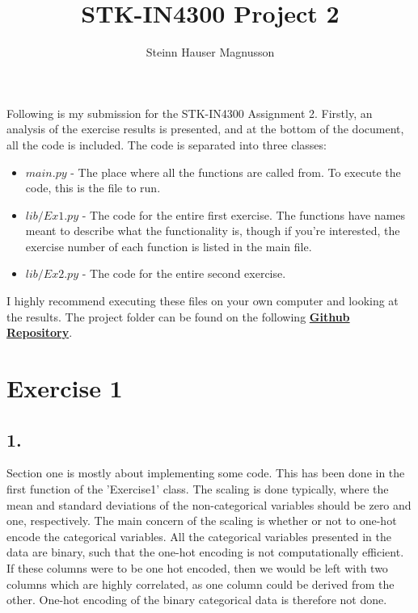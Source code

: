 \documentclass[]{article}
\title{STK-IN4300 Project 2}
\author{Steinn Hauser Magnusson}
\begin{document}
\maketitle

Following is my submission for the STK-IN4300 Assignment 2. Firstly, an analysis of the exercise results is presented, and at the bottom of the document, all the code is included. The code is separated into three classes:
\begin{itemize}
	\item $main.py$ - The place where all the functions are called from. To execute the code, this is the file to run.
	\item $lib/Ex1.py$ - The code for the entire first exercise. The functions have names meant to describe what the functionality is, though if you're interested, the exercise number of each function is listed in the main file.
	\item $lib/Ex2.py$ - The code for the entire second exercise.
\end{itemize}
I highly recommend executing these files on your own computer and looking at the results. The project folder can be found on the following \href{https://github.com/steinnhauser/Neural-Networks/tree/master/STK-IN4300/P2}{\textbf{Github Repository}}.
\section*{Exercise 1}
\subsection*{1.}
Section one is mostly about implementing some code. This has been done in the first function of the 'Exercise1' class. The scaling is done typically, where the mean and standard deviations of the non-categorical variables should be zero and one, respectively. The main concern of the scaling is whether or not to one-hot encode the categorical variables. All the categorical variables presented in the data are binary, such that the one-hot encoding is not computationally efficient. If these columns were to be one hot encoded, then we would be left with two columns which are highly correlated, as one column could be derived from the other. One-hot encoding of the binary categorical data is therefore not done.
\end{document}
